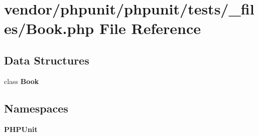 \section{vendor/phpunit/phpunit/tests/\+\_\+files/\+Book.php File Reference}
\label{phpunit_2phpunit_2tests_2__files_2_book_8php}
\subsection*{Data Structures}
\begin{DoxyCompactItemize}
\item 
class {\bf Book}
\end{DoxyCompactItemize}
\subsection*{Namespaces}
\begin{DoxyCompactItemize}
\item 
 {\bf P\+H\+P\+Unit}
\end{DoxyCompactItemize}
